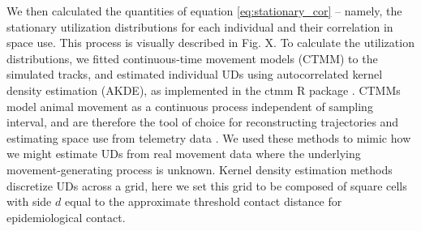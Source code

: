 \documentclass[letterpaper]{article}
\begin{document}
We then calculated the quantities of equation \ref{eq:stationary_cor} -- namely, the stationary utilization distributions for each individual and their correlation in space use.  This process is visually described in Fig. X. To calculate the utilization distributions, we fitted continuous-time movement models (CTMM) to the simulated tracks, and estimated individual UDs using autocorrelated kernel density estimation (AKDE), as implemented in the ctmm R package \citep{Fleming2014, Calabrese2016,Fleming2022}. CTMMs model animal movement as a continuous process independent of sampling interval, and are therefore the tool of choice for reconstructing trajectories and estimating space use from telemetry data \citep{Fleming2014}. We used these methods to mimic how we might estimate UDs from real movement data where the underlying movement-generating process is unknown. Kernel density estimation methods discretize UDs across a grid, here we set this grid to be composed of square cells with side $d$ equal to the approximate threshold contact distance for epidemiological contact. %
\end{document}
